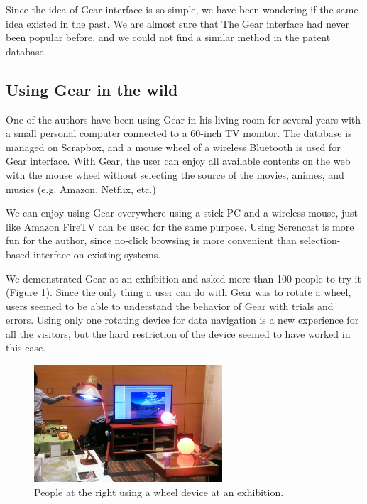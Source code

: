 \documentclass[conference]{IEEEtran}
\def\SC{Serencast}
\def\SB{Scrapbox}
\begin{document}
Since the idea of Gear interface is so simple,
we have been wondering if the same idea existed in the past.
We are almost sure that The Gear interface had never been popular before,
and we could not find a similar method in the patent database.

\subsection{Using Gear in the wild}

One of the authors have been using Gear in his living room for several years
with a small personal computer connected to a 60-inch TV monitor.
The database is managed on {\SB}, and
a mouse wheel of a wireless Bluetooth is used for Gear interface.
With Gear, the user can enjoy all available contents on the web with the mouse wheel
without selecting the source of the movies, animes, and musics (e.g. Amazon, Netflix, etc.)

We can enjoy using Gear everywhere using a stick PC and a wireless mouse,
just like Amazon FireTV can be used for the same purpose.
Using {\SC} is more fun for the author, since no-click browsing is more convenient than
selection-based interface on existing systems.


We demonstrated Gear at an exhibition
and asked more than 100 people to try it
(Figure \ref{exhibition}).
%
Since the only thing a user can do with Gear was to rotate a wheel,
users seemed to be able to understand the behavior of Gear with trials and errors.
% 
% 
Using only one rotating device for data navigation is a new experience for
all the visitors, but the hard restriction of the device seemed to have worked in this case.

\begin{figure}[H]
\centerline{\includegraphics[width=70mm,bb=0 0 527 329]{figures/c520d5dfbd06c532d48d324a7019b00c.png}}
\caption{People at the right using a wheel device at an exhibition.}
\label{exhibition}
\end{figure}
\end{document}
